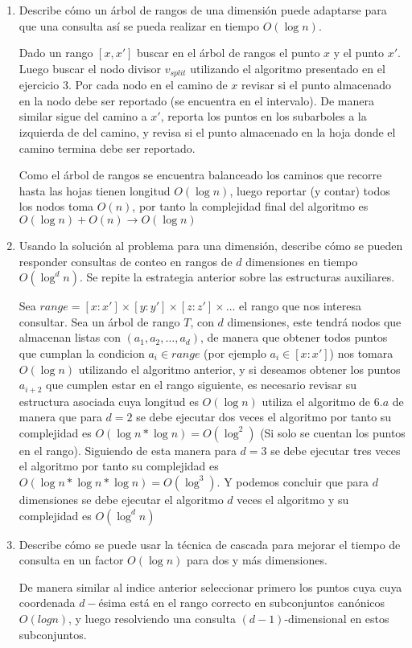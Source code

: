 \begin{enumerate}
  \item Describe cómo un árbol de rangos de una dimensión puede adaptarse para que una consulta así se pueda realizar en tiempo $O(\log n)$.
  
  Dado un rango $[x,x']$ buscar en el árbol de rangos el punto $x$ y el punto $x'$. Luego buscar el nodo divisor $v_{split}$ utilizando el algoritmo presentado en el ejercicio 3.
  Por cada nodo en el camino de $x$ revisar si el punto almacenado en la nodo debe ser reportado (se encuentra en el intervalo). De manera similar sigue del camino a $x'$, reporta los puntos en los subarboles a la izquierda de del camino, y revisa si el punto almacenado en la hoja donde el camino termina debe ser reportado.

  Como el árbol de rangos se encuentra balanceado los caminos que recorre hasta las hojas tienen longitud $O(\log n)$, luego reportar (y contar) todos los nodos toma $O(n)$, por tanto la complejidad final del algoritmo es $O(\log n)+O(n) \rightarrow O(\log n)$
  
  \item Usando la solución al problema para una dimensión, describe cómo se pueden responder consultas de conteo en rangos de $d$ dimensiones en tiempo $O(\log^d n)$.
  Se repite la estrategia anterior sobre las estructuras auxiliares. 

  Sea $range = [x:x']\times [y: y'] \times [z:z'] \times \dots$ el rango que nos interesa consultar. Sea un árbol de rango $T$, con $d$ dimensiones, este tendrá nodos que almacenan listas con $(a_1,a_2,\dots,a_d)$, de manera que obtener todos puntos que cumplan la condicion $a_i \in range$ (por ejemplo $a_i \in [x:x']$) nos tomara $O(\log n)$ utilizando el algoritmo anterior, y si deseamos obtener los puntos $a_{i+2}$ que cumplen estar en el rango siguiente, es necesario revisar su estructura asociada cuya longitud es $O(\log n)$ utiliza el algoritmo de $6.a$ de manera que para $d=2$ se debe ejecutar dos veces el algoritmo por tanto su complejidad es $O(\log n * \log n)= O(\log^2)$ (Si solo se cuentan los puntos en el rango). Siguiendo de esta manera para $d=3$ se debe ejecutar tres veces el algoritmo por tanto su complejidad es $O(\log n * \log n * \log n)= O(\log^3)$. Y podemos concluir que para $d$ dimensiones se debe ejecutar el algoritmo $d$ veces el algoritmo y su complejidad es $O(\log ^d n)$

  \item Describe cómo se puede usar la técnica de cascada para mejorar el tiempo de consulta en un factor $O(\log n)$ para dos y más dimensiones.
  
  De manera similar al indice anterior seleccionar primero los puntos cuya cuya coordenada $d-$ésima está en el rango correcto en subconjuntos canónicos $O(log n)$, y luego resolviendo una consulta $(d-1)$-dimensional en estos subconjuntos. 
\end{enumerate}

